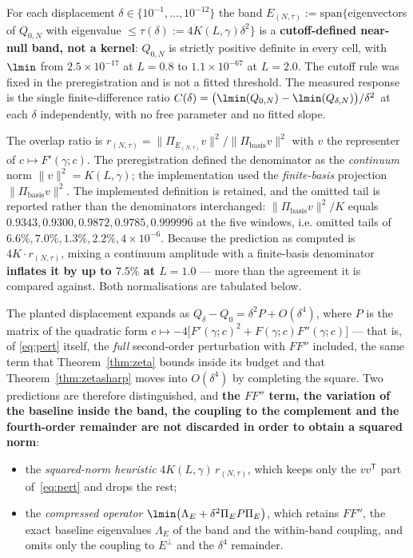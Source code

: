 For each displacement $\delta\in\{10^{-1},\dots,10^{-12}\}$ the band
$E_{(N,\tau)}:=\mathrm{span}\{$eigenvectors of $Q_{0,N}$ with eigenvalue
$\le\tau(\delta):=4K(L,\gamma)\delta^{2}\}$ is a \textbf{cutoff-defined near-null band, not
a kernel}: $Q_{0,N}$ is strictly positive definite in every cell, with $\lmin$ from
$2.5\times10^{-17}$ at $L=0.8$ to $1.1\times10^{-67}$ at $L=2.0$. The cutoff rule was fixed
in the preregistration and is not a fitted threshold. The measured response is the single
finite-difference ratio
$C(\delta)=\bigl(\lmin(Q_{0,N})-\lmin(Q_{\delta,N})\bigr)/\delta^{2}$ at each $\delta$
independently, with no free parameter and no fitted slope.

The overlap ratio is $r_{(N,\tau)}=\|\Pi_{E_{(N,\tau)}}v\|^{2}/\|\Pi_{\mathrm{basis}}v\|^{2}$
with $v$ the representer of $c\mapsto F'(\gamma;c)$. The preregistration defined the
denominator as the \emph{continuum} norm $\|v\|^{2}=K(L,\gamma)$; the implementation used
the \emph{finite-basis} projection $\|\Pi_{\mathrm{basis}}v\|^{2}$. The implemented
definition is retained, and the omitted tail is reported rather than the denominators
interchanged: $\|\Pi_{\mathrm{basis}}v\|^{2}/K$ equals
$0.9343,0.9300,0.9872,0.9785,0.99999\overline{6}$ at the five windows, i.e. omitted tails of
$6.6\%,7.0\%,1.3\%,2.2\%,4\times10^{-6}$. Because the prediction as computed is
$4K\cdot r_{(N,\tau)}$, mixing a continuum amplitude with a finite-basis denominator
\textbf{inflates it by up to $7.5\%$ at $L=1.0$} --- more than the agreement it is compared
against. Both normalisations are tabulated below.

The planted displacement expands as $Q_\delta-Q_0=\delta^{2}P+O(\delta^{4})$, where $P$ is
the matrix of the quadratic form
$c\mapsto-4\bigl[F'(\gamma;c)^{2}+F(\gamma;c)F''(\gamma;c)\bigr]$ --- that is, of
\eqref{eq:pert} itself, the \emph{full} second-order perturbation with $FF''$ included,
the same term that
Theorem~\ref{thm:zeta} bounds inside its budget and that Theorem~\ref{thm:zetasharp} moves
into $O(\delta^{4})$ by completing the square. Two predictions are therefore distinguished,
and \textbf{the $FF''$ term, the variation of the baseline inside the band, the coupling to
the complement and the fourth-order remainder are not discarded in order to obtain a
squared norm}:
\begin{itemize}\itemsep1pt
\item the \emph{squared-norm heuristic} $4K(L,\gamma)\,r_{(N,\tau)}$, which keeps only the
$vv^{\mathsf T}$ part of~\eqref{eq:pert} and drops the rest;
\item the \emph{compressed operator} $\lmin\bigl(\Lambda_E+\delta^{2}\Pi_EP\Pi_E\bigr)$,
which retains $FF''$, the exact baseline eigenvalues $\Lambda_E$ of the band and the
within-band coupling, and omits only the coupling to $E^{\perp}$ and the $\delta^{4}$
remainder.
\end{itemize}

